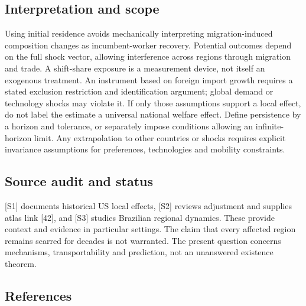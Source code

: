 \documentclass[11pt,a4paper]{article}
\begin{document}
\subsection*{Interpretation and scope}
Using initial residence avoids mechanically interpreting migration-induced composition changes as incumbent-worker recovery. Potential outcomes depend on the full shock vector, allowing interference across regions through migration and trade. A shift-share exposure is a measurement device, not itself an exogenous treatment. An instrument based on foreign import growth requires a stated exclusion restriction and identification argument; global demand or technology shocks may violate it. If only those assumptions support a local effect, do not label the estimate a universal national welfare effect. Define persistence by a horizon and tolerance, or separately impose conditions allowing an infinite-horizon limit. Any extrapolation to other countries or shocks requires explicit invariance assumptions for preferences, technologies and mobility constraints.

\subsection*{Source audit and status}
[S1] documents historical US local effects, [S2] reviews adjustment and supplies atlas link [42], and [S3] studies Brazilian regional dynamics. These provide context and evidence in particular settings. The claim that every affected region remains scarred for decades is not warranted. The present question concerns mechanisms, transportability and prediction, not an unanswered existence theorem.

\subsection*{References}
\end{document}
